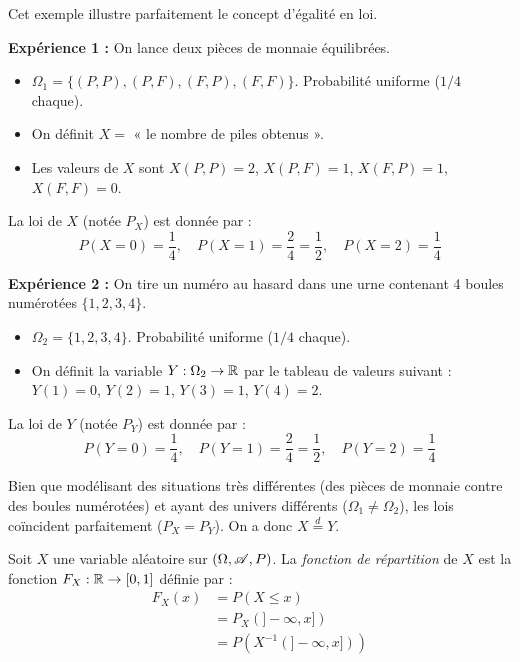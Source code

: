 \begin{exemple}
    Cet exemple illustre parfaitement le concept d'égalité en loi.
    
    \textbf{Expérience 1 :} On lance deux pièces de monnaie équilibrées. 
    \begin{itemize}
        \item $\Omega_1 = \{(P,P), (P,F), (F,P), (F,F)\}$. Probabilité uniforme ($1/4$ chaque).
        \item On définit $X =$ « le nombre de piles obtenus ».
        \item Les valeurs de $X$ sont $X(P,P) = 2$, $X(P,F) = 1$, $X(F,P) = 1$, $X(F,F) = 0$.
    \end{itemize}
    La loi de $X$ (notée $P_X$) est donnée par :
    \[
    P(X=0) = \frac{1}{4}, \quad P(X=1) = \frac{2}{4} = \frac{1}{2}, \quad P(X=2) = \frac{1}{4}
    \]

    \textbf{Expérience 2 :} On tire un numéro au hasard dans une urne contenant 4 boules numérotées $\{1, 2, 3, 4\}$.
    \begin{itemize}
        \item $\Omega_2 = \{1, 2, 3, 4\}$. Probabilité uniforme ($1/4$ chaque).
        \item On définit la variable $Y : \Omega_2 \to \mathbb{R}$ par le tableau de valeurs suivant :
        $Y(1) = 0$, $Y(2) = 1$, $Y(3) = 1$, $Y(4) = 2$.
    \end{itemize}
    La loi de $Y$ (notée $P_Y$) est donnée par :
    \[
    P(Y=0) = \frac{1}{4}, \quad P(Y=1) = \frac{2}{4} = \frac{1}{2}, \quad P(Y=2) = \frac{1}{4}
    \]
    
     Bien que modélisant des situations très différentes (des pièces de monnaie contre des boules numérotées) et ayant des univers différents ($\Omega_1 \neq \Omega_2$), les lois coïncident parfaitement ($P_X = P_Y$). On a donc $X \overset{d}{=} Y$.
\end{exemple}

\begin{definition}
    Soit $X$ une variable aléatoire sur $(\Omega, \mathscr{A}, P)$. La \emph{fonction de répartition} de $X$ est la fonction $F_X: \mathbb{R} \to [0,1]$ définie par :
    \begin{align*}
       F_X(x) &= P(X \leq x) \\
       &= P_X(]-\infty, x]) \\
       &= P\!\left(X^{-1}(]-\infty, x])\right)
    \end{align*}
\end{definition}

